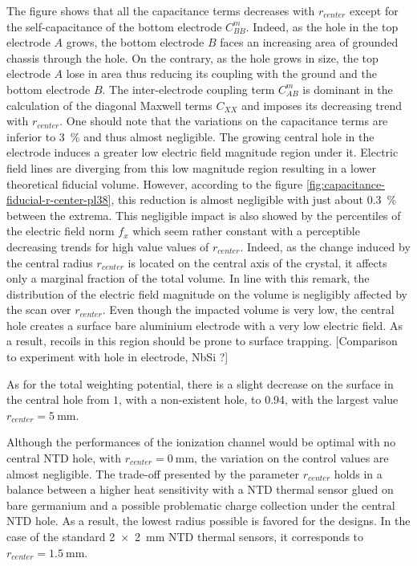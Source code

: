 The figure shows that all the capacitance terms decreases with $r_{center}$ except for the self-capacitance of the bottom electrode $C_{BB}^m$. Indeed, as the hole in the top electrode $A$ grows, the bottom electrode $B$ faces an increasing area of grounded chassis through the hole. On the contrary, as the hole grows in size, the top electrode $A$ lose in area thus reducing its coupling with the ground and the bottom electrode $B$. The inter-electrode coupling term $C_{AB}^m$ is dominant in the calculation of the diagonal Maxwell terms $C_{XX}$ and imposes its decreasing trend with $r_{center}$. One should note that the variations on the capacitance terms are inferior to \SI{3}{\percent} and thus almost negligible.
The growing central hole in the electrode induces a greater low electric field magnitude region under it. Electric field lines are diverging from this low magnitude region resulting in a lower theoretical fiducial volume. However, according to the figure \ref{fig:capacitance-fiducial-r-center-pl38}, this reduction is almost negligible with just about \SI{0.3}{\percent} between the extrema.
This negligible impact is also showed by the percentiles of the electric field norm $f_x$ which seem rather constant with a perceptible decreasing trends for high value values of $r_{center}$. Indeed, as the change induced by the central radius $r_{center}$ is located on the central axis of the crystal, it affects only a marginal fraction of the total volume. In line with this remark, the distribution of the electric field magnitude on the volume is negligibly affected by the scan over $r_{center}$. Even though the impacted volume is very low, the central hole creates a surface bare aluminium electrode with a very low electric field. As a result, recoils in this region should be prone to surface trapping. {\color{red} [Comparison to experiment with hole in electrode, NbSi ?]}

As for the total weighting potential, there is a slight decrease on the surface in the central hole from $1$, with a non-existent hole, to \num{0.94}, with the largest value $r_{center}=\SI{5}{\mm}$.

Although the performances of the ionization channel would be optimal with no central NTD hole, with $r_{center}=\SI{0}{\mm}$, the variation on the control values are almost negligible. The trade-off presented by the parameter $r_{center}$ holds in a balance between a higher heat sensitivity with a NTD thermal sensor glued on bare germanium and a possible problematic charge collection under the central NTD hole. As a result, the lowest radius possible is favored for the designs. In the case of the standard \SI{2 x 2}{\mm} NTD thermal sensors, it corresponds to $r_{center}=\SI{1.5}{\mm}$.

